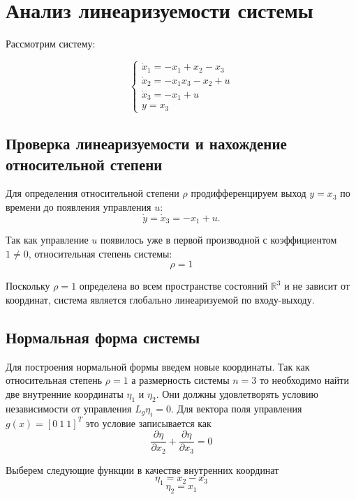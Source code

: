 \documentclass[a4paper,12pt]{article}
\begin{document}
	\newpage
	\tableofcontents
	
	
	\newpage \section{Анализ линеаризуемости системы}
	



Рассмотрим систему:

\begin{equation}
	\begin{cases}
		\dot{x}_1 = -x_1 + x_2 - x_3 \\
		\dot{x}_2 = -x_1 x_3 - x_2 + u \\
		\dot{x}_3 = -x_1 + u \\
		y = x_3
	\end{cases}
\end{equation}

\subsection{Проверка линеаризуемости и нахождение относительной степени}

Для определения относительной степени $\rho$ продифференцируем выход $y = x_3$ по времени до появления управления $u$:
$$ \dot{y} = \dot{x}_3 = -x_1 + u. $$

Так как управление $u$ появилось уже в первой производной с коэффициентом $1 \neq 0$, относительная степень системы:
$$ \rho = 1$$

Поскольку $\rho = 1$ определена во всем пространстве состояний $\mathbb{R}^3$ и не зависит от координат, система является глобально линеаризуемой по входу-выходу.


\subsection{Нормальная форма системы}

Для построения нормальной формы введем новые координаты. Так как относительная степень $\rho=1$ а размерность системы $n=3$ то необходимо найти две внутренние координаты $\eta_1$ и $\eta_2$. Они должны удовлетворять условию независимости от управления $L_g \eta_i = 0$. Для вектора поля управления $g(x)=[0 \ 1 \ 1]^T$ это условие записывается как
$$ \frac{\partial \eta}{\partial x_2} + \frac{\partial \eta}{\partial x_3} = 0 $$

Выберем следующие функции в качестве внутренних координат
$$ \eta_1 = x_2 - x_3 $$
$$ \eta_2 = x_1 $$
\end{document}
